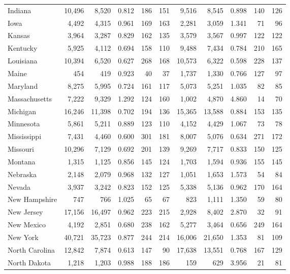 \documentclass[
]{article}
\begin{document}
\begin{table}
\begin{tabular}[t]{lrrrrrrrrrr}
Indiana & 10,496 & 8,520 & 0.812 & 186 & 151 & 9,516 & 8,545 & 0.898 & 140 & 126\\
\addlinespace
Iowa & 4,492 & 4,315 & 0.961 & 169 & 163 & 2,281 & 3,059 & 1.341 & 71 & 96\\
Kansas & 3,964 & 3,287 & 0.829 & 162 & 135 & 3,579 & 3,567 & 0.997 & 122 & 122\\
Kentucky & 5,925 & 4,112 & 0.694 & 158 & 110 & 9,488 & 7,434 & 0.784 & 210 & 165\\
Louisiana & 10,394 & 6,520 & 0.627 & 268 & 168 & 10,573 & 6,322 & 0.598 & 228 & 137\\
Maine & 454 & 419 & 0.923 & 40 & 37 & 1,737 & 1,330 & 0.766 & 127 & 97\\
\addlinespace
Maryland & 8,275 & 5,995 & 0.724 & 161 & 117 & 5,073 & 5,251 & 1.035 & 82 & 85\\
Massachusetts & 7,222 & 9,329 & 1.292 & 124 & 160 & 1,002 & 4,870 & 4.860 & 14 & 70\\
Michigan & 16,246 & 11,398 & 0.702 & 194 & 136 & 15,365 & 13,588 & 0.884 & 153 & 135\\
Minnesota & 5,861 & 5,211 & 0.889 & 123 & 110 & 4,152 & 4,429 & 1.067 & 73 & 78\\
Mississippi & 7,431 & 4,460 & 0.600 & 301 & 181 & 8,007 & 5,076 & 0.634 & 271 & 172\\
\addlinespace
Missouri & 10,296 & 7,129 & 0.692 & 201 & 139 & 9,269 & 7,717 & 0.833 & 150 & 125\\
Montana & 1,315 & 1,125 & 0.856 & 145 & 124 & 1,703 & 1,594 & 0.936 & 155 & 145\\
Nebraska & 2,148 & 2,079 & 0.968 & 132 & 127 & 1,051 & 1,653 & 1.573 & 54 & 84\\
Nevada & 3,937 & 3,242 & 0.823 & 152 & 125 & 5,338 & 5,136 & 0.962 & 170 & 164\\
New Hampshire & 747 & 766 & 1.025 & 65 & 67 & 823 & 1,111 & 1.350 & 59 & 80\\
\addlinespace
New Jersey & 17,156 & 16,497 & 0.962 & 223 & 215 & 2,928 & 8,402 & 2.870 & 32 & 91\\
New Mexico & 4,192 & 2,851 & 0.680 & 238 & 162 & 5,277 & 3,464 & 0.656 & 249 & 164\\
New York & 40,721 & 35,723 & 0.877 & 244 & 214 & 16,006 & 21,650 & 1.353 & 81 & 109\\
North Carolina & 12,842 & 7,874 & 0.613 & 147 & 90 & 17,638 & 13,551 & 0.768 & 167 & 129\\
North Dakota & 1,218 & 1,203 & 0.988 & 188 & 186 & 159 & 629 & 3.956 & 21 & 81\\

\end{tabular}
\end{table}
\end{document}
